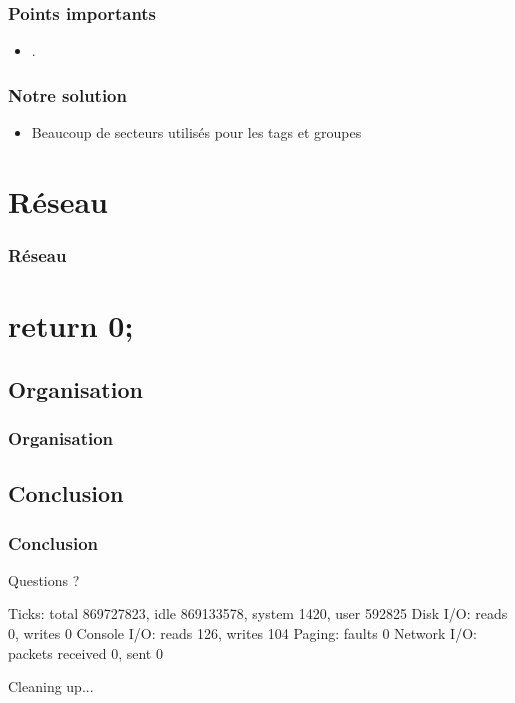 \documentclass{beamer}
\begin{document}
\begin{frame}
  \frametitle{Points importants}
  \begin{itemize}
  \item .
  \end{itemize}
\end{frame}

\begin{frame}
  \frametitle{Notre solution}
  \begin{itemize}
  \item Beaucoup de secteurs utilisés pour les tags et groupes
  \end{itemize}
\end{frame}

\section{Réseau}
\begin{frame}
  \frametitle{Réseau}
\end{frame}


\section*{return 0;}

\subsection{Organisation}
\begin{frame}
  \frametitle{Organisation}
\end{frame}

\subsection{Conclusion}
\begin{frame}[fragile]
  \frametitle{Conclusion}
\begin{verbaterm}[fontsize=\scriptsize]
Questions ?

Ticks: total 869727823, idle 869133578, system 1420, user 592825
Disk I/O: reads 0, writes 0
Console I/O: reads 126, writes 104
Paging: faults 0
Network I/O: packets received 0, sent 0

Cleaning up...
\end{verbaterm}

\end{frame}
\end{document}
